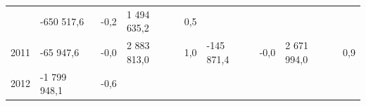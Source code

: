 \begin{longtable}[]{@{}lllllllll@{}}
\begin{minipage}[t]{0.06\columnwidth}
\end{minipage} & \begin{minipage}[t]{0.12\columnwidth}\raggedright
-650 517,6\strut
\end{minipage} & \begin{minipage}[t]{0.06\columnwidth}\raggedright
-0,2\strut
\end{minipage} & \begin{minipage}[t]{0.10\columnwidth}\raggedright
1 494 635,2\strut
\end{minipage} & \begin{minipage}[t]{0.06\columnwidth}\raggedright
0,5\strut
\end{minipage}\tabularnewline
\begin{minipage}[t]{0.05\columnwidth}\raggedright
2011\strut
\end{minipage} & \begin{minipage}[t]{0.10\columnwidth}\raggedright
-65 947,6\strut
\end{minipage} & \begin{minipage}[t]{0.06\columnwidth}\raggedright
-0,0\strut
\end{minipage} & \begin{minipage}[t]{0.16\columnwidth}\raggedright
2 883 813,0\strut
\end{minipage} & \begin{minipage}[t]{0.06\columnwidth}\raggedright
1,0\strut
\end{minipage} & \begin{minipage}[t]{0.12\columnwidth}\raggedright
-145 871,4\strut
\end{minipage} & \begin{minipage}[t]{0.06\columnwidth}\raggedright
-0,0\strut
\end{minipage} & \begin{minipage}[t]{0.10\columnwidth}\raggedright
2 671 994,0\strut
\end{minipage} & \begin{minipage}[t]{0.06\columnwidth}\raggedright
0,9\strut
\end{minipage}\tabularnewline
\begin{minipage}[t]{0.05\columnwidth}\raggedright
2012\strut
\end{minipage} & \begin{minipage}[t]{0.10\columnwidth}\raggedright
-1 799 948,1\strut
\end{minipage} & \begin{minipage}[t]{0.06\columnwidth}\raggedright
-0,6\strut
\end{minipage} & \begin{minipage}[t]{0.16\columnwidth}\raggedright

\end{minipage}
\end{longtable}

